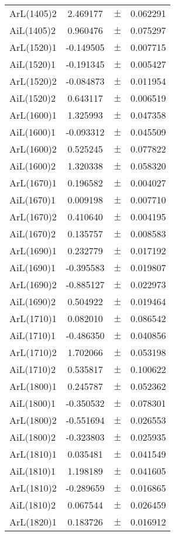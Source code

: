 \begin{table}
\begin{tiny}
\begin{tabular}{lccc}
ArL(1405)2 & 2.469177 & $\pm$ & 0.062291 \\
AiL(1405)2 & 0.960476 & $\pm$ & 0.075297 \\
ArL(1520)1 & -0.149505 & $\pm$ & 0.007715 \\
AiL(1520)1 & -0.191345 & $\pm$ & 0.005427 \\
ArL(1520)2 & -0.084873 & $\pm$ & 0.011954 \\
AiL(1520)2 & 0.643117 & $\pm$ & 0.006519 \\
ArL(1600)1 & 1.325993 & $\pm$ & 0.047358 \\
AiL(1600)1 & -0.093312 & $\pm$ & 0.045509 \\
ArL(1600)2 & 0.525245 & $\pm$ & 0.077822 \\
AiL(1600)2 & 1.320338 & $\pm$ & 0.058320 \\
ArL(1670)1 & 0.196582 & $\pm$ & 0.004027 \\
AiL(1670)1 & 0.009198 & $\pm$ & 0.007710 \\
ArL(1670)2 & 0.410640 & $\pm$ & 0.004195 \\
AiL(1670)2 & 0.135757 & $\pm$ & 0.008583 \\
ArL(1690)1 & 0.232779 & $\pm$ & 0.017192 \\
AiL(1690)1 & -0.395583 & $\pm$ & 0.019807 \\
ArL(1690)2 & -0.885127 & $\pm$ & 0.022973 \\
AiL(1690)2 & 0.504922 & $\pm$ & 0.019464 \\
ArL(1710)1 & 0.082010 & $\pm$ & 0.086542 \\
AiL(1710)1 & -0.486350 & $\pm$ & 0.040856 \\
ArL(1710)2 & 1.702066 & $\pm$ & 0.053198 \\
AiL(1710)2 & 0.535817 & $\pm$ & 0.100622 \\
ArL(1800)1 & 0.245787 & $\pm$ & 0.052362 \\
AiL(1800)1 & -0.350532 & $\pm$ & 0.078301 \\
ArL(1800)2 & -0.551694 & $\pm$ & 0.026553 \\
AiL(1800)2 & -0.323803 & $\pm$ & 0.025935 \\
ArL(1810)1 & 0.035481 & $\pm$ & 0.041549 \\
AiL(1810)1 & 1.198189 & $\pm$ & 0.041605 \\
ArL(1810)2 & -0.289659 & $\pm$ & 0.016865 \\
AiL(1810)2 & 0.067544 & $\pm$ & 0.026459 \\
ArL(1820)1 & 0.183726 & $\pm$ & 0.016912 \\

\end{tabular}
\end{tiny}
\end{table}
